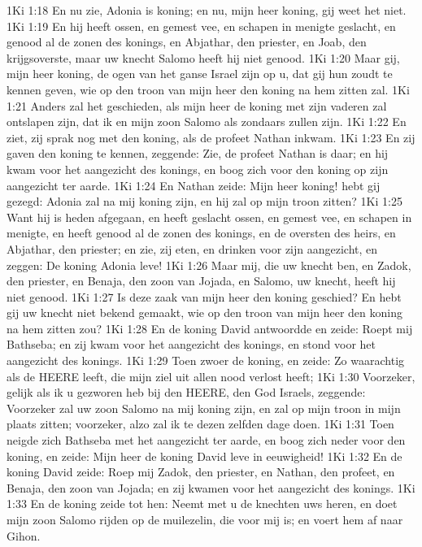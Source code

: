 1Ki 1:18  En nu zie, Adonia is koning; en nu, mijn heer koning, gij weet het niet.
1Ki 1:19  En hij heeft ossen, en gemest vee, en schapen in menigte geslacht, en genood al de zonen des konings, en Abjathar, den priester, en Joab, den krijgsoverste, maar uw knecht Salomo heeft hij niet genood.
1Ki 1:20  Maar gij, mijn heer koning, de ogen van het ganse Israel zijn op u, dat gij hun zoudt te kennen geven, wie op den troon van mijn heer den koning na hem zitten zal.
1Ki 1:21  Anders zal het geschieden, als mijn heer de koning met zijn vaderen zal ontslapen zijn, dat ik en mijn zoon Salomo als zondaars zullen zijn.
1Ki 1:22  En ziet, zij sprak nog met den koning, als de profeet Nathan inkwam.
1Ki 1:23  En zij gaven den koning te kennen, zeggende: Zie, de profeet Nathan is daar; en hij kwam voor het aangezicht des konings, en boog zich voor den koning op zijn aangezicht ter aarde.
1Ki 1:24  En Nathan zeide: Mijn heer koning! hebt gij gezegd: Adonia zal na mij koning zijn, en hij zal op mijn troon zitten?
1Ki 1:25  Want hij is heden afgegaan, en heeft geslacht ossen, en gemest vee, en schapen in menigte, en heeft genood al de zonen des konings, en de oversten des heirs, en Abjathar, den priester; en zie, zij eten, en drinken voor zijn aangezicht, en zeggen: De koning Adonia leve!
1Ki 1:26  Maar mij, die uw knecht ben, en Zadok, den priester, en Benaja, den zoon van Jojada, en Salomo, uw knecht, heeft hij niet genood.
1Ki 1:27  Is deze zaak van mijn heer den koning geschied? En hebt gij uw knecht niet bekend gemaakt, wie op den troon van mijn heer den koning na hem zitten zou?
1Ki 1:28  En de koning David antwoordde en zeide: Roept mij Bathseba; en zij kwam voor het aangezicht des konings, en stond voor het aangezicht des konings.
1Ki 1:29  Toen zwoer de koning, en zeide: Zo waarachtig als de HEERE leeft, die mijn ziel uit allen nood verlost heeft;
1Ki 1:30  Voorzeker, gelijk als ik u gezworen heb bij den HEERE, den God Israels, zeggende: Voorzeker zal uw zoon Salomo na mij koning zijn, en zal op mijn troon in mijn plaats zitten; voorzeker, alzo zal ik te dezen zelfden dage doen.
1Ki 1:31  Toen neigde zich Bathseba met het aangezicht ter aarde, en boog zich neder voor den koning, en zeide: Mijn heer de koning David leve in eeuwigheid!
1Ki 1:32  En de koning David zeide: Roep mij Zadok, den priester, en Nathan, den profeet, en Benaja, den zoon van Jojada; en zij kwamen voor het aangezicht des konings.
1Ki 1:33  En de koning zeide tot hen: Neemt met u de knechten uws heren, en doet mijn zoon Salomo rijden op de muilezelin, die voor mij is; en voert hem af naar Gihon.

